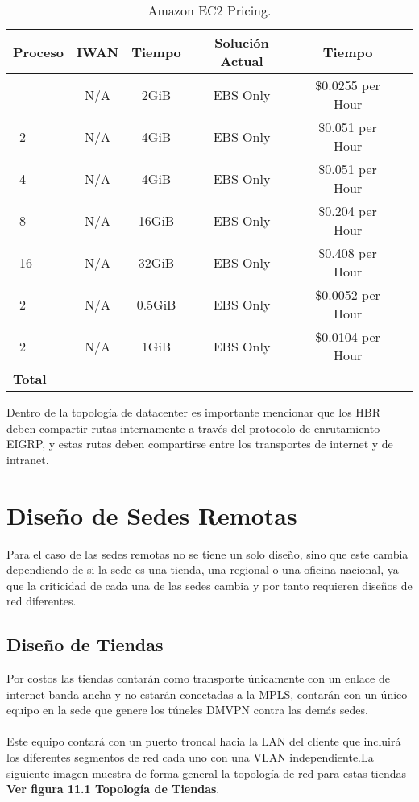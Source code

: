 \begin{table}[ht]
	\caption{Amazon EC2 Pricing.}
	\label{tab:hla:results}
\centering
\begin{tabular}{lccccc}
	\toprule
	\multicolumn{1}{c}{\textbf{Proceso}} 	& \textbf{IWAN}	& \textbf{Tiempo}	& \textbf{Solución Actual}
	& \textbf{Tiempo}\\
	\midrule
\cite{Aprovisionamiento tienda nueva} 		& N/A & 2GiB & EBS Only	& \$0.0255 per Hour \\
\cite{a1.large}~2 		& N/A & 4GiB & EBS Only & \$0.051 per Hour	\\
\cite{a1.xlarge}~4		& N/A & 4GiB & EBS Only & \$0.051 per Hour	\\
\cite{a1.2xlarge}~8 	& N/A & 16GiB & EBS Only & \$0.204 per Hour	\\
\cite{a1.4xlarge}~16	& N/A & 32GiB & EBS Only & \$0.408 per Hour	\\
\cite{t3.nano}~2		& N/A & 0.5GiB & EBS Only & \$0.0052 per Hour	\\
\cite{t3.micro}~2   	& N/A & 1GiB & EBS Only & \$0.0104 per Hour	\\
	\midrule
	\textbf{Total}			& \textbf{--}		& \textbf{--}		& \textbf{--} \\
	\bottomrule
\end{tabular}
\end{table}

Dentro de la topología de datacenter es importante mencionar que los HBR deben compartir rutas internamente a través del protocolo de enrutamiento EIGRP, y estas rutas deben compartirse entre los transportes de internet y de intranet.

\chapter{Diseño de Sedes Remotas}
\label{cha:Diseño de Sedes Remotas}

Para el caso de las sedes remotas no se tiene un solo diseño, sino que este cambia dependiendo de si la sede es una tienda, una regional o una oficina nacional, ya que la criticidad de cada una de las sedes cambia y por tanto requieren diseños de red diferentes.

\section{Diseño de Tiendas} %
\label{sec:Diseño de Tiendas}

Por costos las tiendas contarán como transporte únicamente con un enlace de internet banda ancha y no estarán conectadas a la MPLS, contarán con un único equipo en la sede que genere los túneles DMVPN contra las demás sedes.
\\
\\
Este equipo contará con un puerto troncal hacia la LAN del cliente que incluirá los diferentes segmentos de red cada uno con una VLAN independiente.La siguiente imagen muestra de forma general la topología de red para estas tiendas \textbf{Ver figura 11.1 Topología de Tiendas}.

